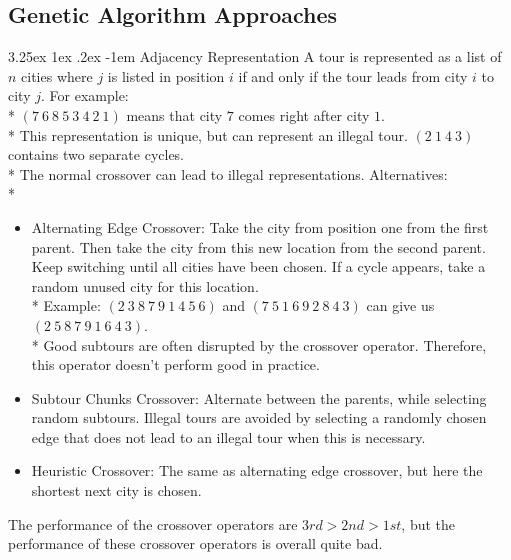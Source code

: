 \documentclass[12pt]{book}
\makeatletter
\newcounter{subsubsubsection}[subsubsection]
\renewcommand\paragraph{\@startsection{paragraph}{5}{\z@}%
  {3.25ex \@plus1ex \@minus.2ex}%
  {-1em}%
  {\normalfont\normalsize\bfseries}}
\makeatother
\begin{document}
\subsection{Genetic Algorithm Approaches}
\paragraph{Adjacency Representation}
A tour is represented as a list of $n$ cities where $j$ is listed in position $i$ if and only if the tour leads from city $i$ to city $j$. For example:\\*
$(7\ 6\ 8\ 5\ 3\ 4\ 2\ 1)$ means that city $7$ comes right after city $1$.\\*
This representation is unique, but can represent an illegal tour. $(2\ 1\ 4\ 3)$ contains two separate cycles.\\*
The normal crossover can lead to illegal representations. Alternatives:\\*
\begin{itemize}
\item Alternating Edge Crossover: Take the city from position one from the first parent. Then take the city from this new location from the second parent. Keep switching until all cities have been chosen. If a cycle appears, take a random unused city for this location.\\*
Example: $(2\ 3\ 8\ 7\ 9\ 1\ 4\ 5\ 6)$ and $(7\ 5\ 1\ 6\ 9\ 2\ 8\ 4\ 3)$ can give us $(2\ 5\ 8\ 7\ 9\ 1\ 6\ 4\ 3)$.\\*
Good subtours are often disrupted by the crossover operator. Therefore, this operator doesn't perform good in practice.
\item Subtour Chunks Crossover: Alternate between the parents, while selecting random subtours. Illegal tours are avoided by selecting a randomly chosen edge that does not lead to an illegal tour when this is necessary.
\item Heuristic Crossover: The same as alternating edge crossover, but here the shortest next city is chosen.
\end{itemize}
The performance of the crossover operators are $3rd > 2nd > 1st$, but the performance of these crossover operators is overall quite bad.\\
\end{document}
